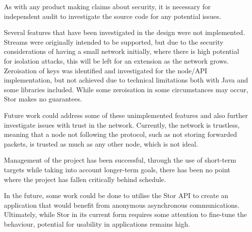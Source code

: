 		As with any product making claims about security, it is necessary for independent audit to investigate the source code for any potential issues.
		
		Several features that have been investigated in the design were not implemented. Streams were originally intended to be supported, but due to the security considerations of having a small network initially, where there is high potential for isolation attacks, this will be left for an extension as the network grows. Zeroisation of keys was identified and investigated for the node/API implementation, but not achieved due to technical limitations both with Java and some libraries included. While some zeroisation in some circumstances may occur, Stor makes no guarantees.
		
		Future work could address some of these unimplemented features and also further investigate issues with trust in the network. Currently, the network is trustless, meaning that a node not following the protocol, such as not storing forwarded packets, is trusted as much as any other node, which is not ideal.
		
		Management of the project has been successful, through the use of short-term targets while taking into account longer-term goals, there has been no point where the project has fallen critically behind schedule.

		In the future, some work could be done to utilise the Stor API to create an application that would benefit from anonymous asynchronous communications.	Ultimately, while Stor in its current form requires some attention to fine-tune the behaviour, potential for usability in applications remains high.